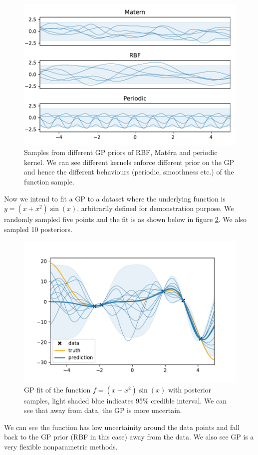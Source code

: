 \documentclass{statsmsc}
\begin{document}
\begin{figure}[H] 
  \includegraphics[width=0.7\linewidth]{../figures/prior.pdf}
  \centering
  \caption{Samples from different GP priors of RBF, Matérn and periodic kernel. We can see different kernels enforce different prior on the GP and hence the different behaviours (periodic, smoothness etc.) of the function sample.}
  \label{fig:prior}
\end{figure}

Now we intend to fit a GP to a dataset where the underlying function is $y=(x+x^2)\sin(x)$, arbitrarily defined for demonstration purpose.
We randomly sampled five points and the fit is as shown below in figure \ref{fig:posterior}.
We also sampled 10 posteriors.

\begin{figure}[H] 
  \includegraphics[width=0.7\linewidth]{../figures/posterior.pdf}
  \centering
  \caption{GP fit of the function $f=(x+x^2)\sin(x)$ with posterior samples, light shaded blue indicates 95\% credible interval. We can see that away from data, the GP is more uncertain.}
  \label{fig:posterior}
\end{figure}

We can see the function has low uncertainity around the data points and fall back to the GP prior (RBF in this case) away from the data. 
We also see GP is a very flexible nonparametric methods.
\end{document}
